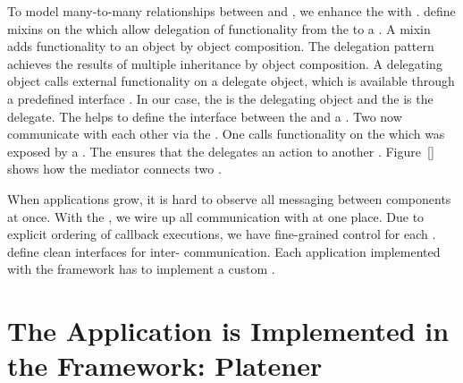 \documentclass[../ClassicThesis.tex]{subfiles}
\begin{document}
To model many-to-many relationships between  and
, we enhance the  with
.  define mixins on the
 which allow delegation of functionality from the
 to a . A mixin adds functionality to
an object by object composition\cite{}. The delegation pattern achieves the results of multiple
inheritance by object composition. A delegating object calls external
functionality on a delegate object, which is available through a
predefined interface \cite{delegation}. In
our case, the  is the delegating object and the
 is the delegate. The  helps to define
the interface between the  and a . Two
 now communicate with each other via the
. One  calls functionality on the
 which was exposed by a . The
 ensures that the  delegates an
action to another . Figure~\ref{} shows how the mediator connects two .

When applications grow, it is hard to observe all messaging between
components at once. With the , we wire up all
communication with  at one place. Due to explicit
ordering of callback executions, we have fine-grained control for each
.  define clean interfaces for
inter- communication. Each application implemented with
the {\convertify} framework has to implement a custom .


\section{The Application is Implemented in the Framework: Platener}
\label{sec:application-platener}

\end{document}

